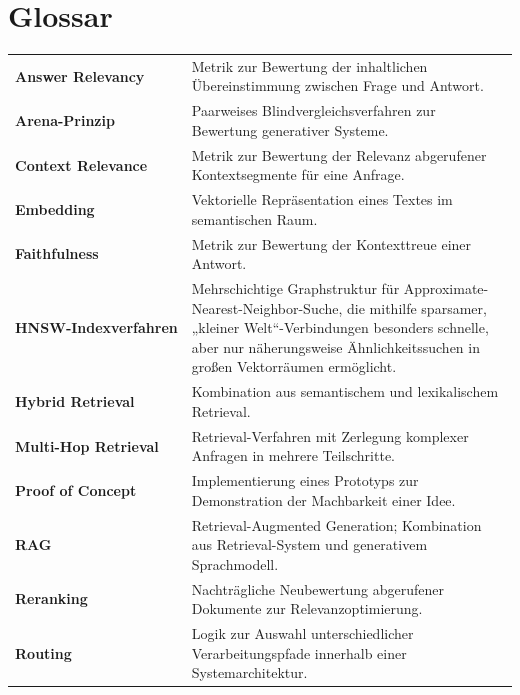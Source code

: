 \chapter{Glossar}

\renewcommand{\arraystretch}{1.3}

\begin{tabularx}{\textwidth}{>{\bfseries}p{4cm} X}

Answer Relevancy & Metrik zur Bewertung der inhaltlichen Übereinstimmung zwischen Frage und Antwort. \\

Arena-Prinzip & Paarweises Blindvergleichsverfahren zur Bewertung generativer Systeme. \\

Context Relevance & Metrik zur Bewertung der Relevanz abgerufener Kontextsegmente für eine Anfrage. \\

Embedding & Vektorielle Repräsentation eines Textes im semantischen Raum. \\

Faithfulness & Metrik zur Bewertung der Kontexttreue einer Antwort. \\

HNSW‑Indexverfahren & Mehrschichtige Graphstruktur für Approximate-Nearest-Neighbor-Suche, die mithilfe sparsamer, „kleiner Welt“-Verbindungen besonders schnelle, aber nur näherungsweise Ähnlichkeitssuchen in großen Vektorräumen ermöglicht. \\

Hybrid Retrieval & Kombination aus semantischem und lexikalischem Retrieval. \\

Multi-Hop Retrieval & Retrieval-Verfahren mit Zerlegung komplexer Anfragen in mehrere Teilschritte. \\

Proof of Concept & Implementierung eines Prototyps zur Demonstration der Machbarkeit einer Idee. \\

RAG & Retrieval-Augmented Generation; Kombination aus Retrieval-System und generativem Sprachmodell. \\

Reranking & Nachträgliche Neubewertung abgerufener Dokumente zur Relevanzoptimierung. \\

Routing & Logik zur Auswahl unterschiedlicher Verarbeitungspfade innerhalb einer Systemarchitektur. \\


\end{tabularx}
